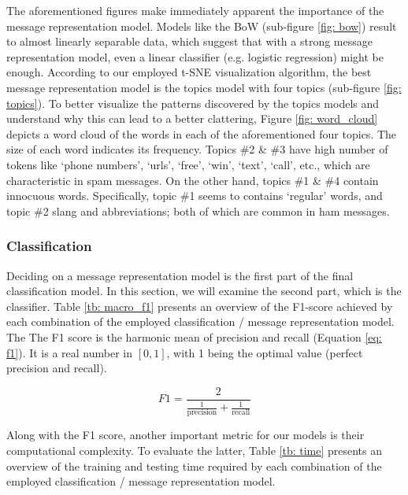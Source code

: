 \documentclass[letterpaper]{article}
\begin{document}
The aforementioned figures make immediately apparent the importance of the message representation model. Models like the BoW (sub-figure \ref{fig: bow}) result to almost linearly separable data, which suggest that with a strong message representation model, even a linear classifier (e.g. logistic regression) might be enough. According to our employed t-SNE visualization algorithm, the best message representation model is the topics model with four topics (sub-figure \ref{fig: topics}). To better visualize the patterns discovered by the topics models and understand why this can lead to a better clattering, Figure \ref{fig: word_cloud} depicts a word cloud of the words in each of the aforementioned four topics. The size of each word indicates its frequency. Topics \#2 \& \#3 have high number of tokens like `phone numbers', `urls', `free', `win', `text', `call', etc., which are characteristic in spam messages. On the other hand, topics \#1 \& \#4 contain innocuous words. Specifically, topic \#1 seems to contains `regular' words, and topic \#2 slang and abbreviations; both of which are common in ham messages.

\subsubsection{Classification}  \label{Classification Results}

Deciding on a message representation model is the first part of the final classification model. In this section, we will examine the second part, which is the classifier. Table \ref{tb: macro_f1} presents an overview of the F1-score achieved by each combination of the employed classification / message representation model. The The F1 score is the harmonic mean of precision and recall (Equation \ref{eq: f1}). It is a real number in $[0, 1]$, with 1 being the optimal value (perfect precision and recall).

\begin{equation} \label{eq: f1}
	F1 = \frac{2}{\frac{1}{\text{precision}} + \frac{1}{\text{recall}}}
\end{equation}

Along with the F1 score, another important metric for our models is their computational complexity. To evaluate the latter, Table \ref{tb: time} presents an overview of the training and testing time required by each combination of the employed classification / message representation model.
\end{document}
